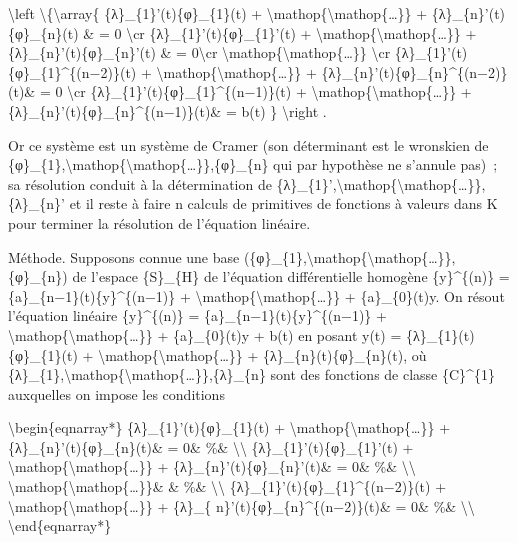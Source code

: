 \documentclass[]{article}
\begin{document}
\textbackslash{}left \textbackslash{}\{\textbackslash{}array\{
\{λ\}\_\{1\}'(t)\{φ\}\_\{1\}(t) +
\textbackslash{}mathop\{\textbackslash{}mathop\{\ldots{}\}\} +
\{λ\}\_\{n\}'(t)\{φ\}\_\{n\}(t) \& = 0 \textbackslash{}cr
\{λ\}\_\{1\}'(t)\{φ\}\_\{1\}'(t) +
\textbackslash{}mathop\{\textbackslash{}mathop\{\ldots{}\}\} +
\{λ\}\_\{n\}'(t)\{φ\}\_\{n\}'(t) \& = 0\textbackslash{}cr
\textbackslash{}mathop\{\textbackslash{}mathop\{\ldots{}\}\}
\textbackslash{}cr \{λ\}\_\{1\}'(t)\{φ\}\_\{1\}\^{}\{(n−2)\}(t) +
\textbackslash{}mathop\{\textbackslash{}mathop\{\ldots{}\}\} +
\{λ\}\_\{n\}'(t)\{φ\}\_\{n\}\^{}\{(n−2)\}(t)\& = 0 \textbackslash{}cr
\{λ\}\_\{1\}'(t)\{φ\}\_\{1\}\^{}\{(n−1)\}(t) +
\textbackslash{}mathop\{\textbackslash{}mathop\{\ldots{}\}\} +
\{λ\}\_\{n\}'(t)\{φ\}\_\{n\}\^{}\{(n−1)\}(t)\& = b(t) \}
\textbackslash{}right .

Or ce système est un système de Cramer (son déterminant est le wronskien
de
\{φ\}\_\{1\},\textbackslash{}mathop\{\textbackslash{}mathop\{\ldots{}\}\},\{φ\}\_\{n\}
qui par hypothèse ne s'annule pas)~; sa résolution conduit à la
détermination de
\{λ\}\_\{1\}',\textbackslash{}mathop\{\textbackslash{}mathop\{\ldots{}\}\},\{λ\}\_\{n\}'
et il reste à faire n calculs de primitives de fonctions à valeurs dans
K pour terminer la résolution de l'équation linéaire.

Méthode. Supposons connue une base
(\{φ\}\_\{1\},\textbackslash{}mathop\{\textbackslash{}mathop\{\ldots{}\}\},\{φ\}\_\{n\})
de l'espace \{S\}\_\{H\} de l'équation différentielle homogène
\{y\}\^{}\{(n)\} = \{a\}\_\{n−1\}(t)\{y\}\^{}\{(n−1)\} +
\textbackslash{}mathop\{\textbackslash{}mathop\{\ldots{}\}\} +
\{a\}\_\{0\}(t)y. On résout l'équation linéaire \{y\}\^{}\{(n)\} =
\{a\}\_\{n−1\}(t)\{y\}\^{}\{(n−1)\} +
\textbackslash{}mathop\{\textbackslash{}mathop\{\ldots{}\}\} +
\{a\}\_\{0\}(t)y + b(t) en posant y(t) = \{λ\}\_\{1\}(t)\{φ\}\_\{1\}(t)
+ \textbackslash{}mathop\{\textbackslash{}mathop\{\ldots{}\}\} +
\{λ\}\_\{n\}(t)\{φ\}\_\{n\}(t), où
\{λ\}\_\{1\},\textbackslash{}mathop\{\textbackslash{}mathop\{\ldots{}\}\},\{λ\}\_\{n\}
sont des fonctions de classe \{C\}\^{}\{1\} auxquelles on impose les
conditions

\textbackslash{}begin\{eqnarray*\} \{λ\}\_\{1\}'(t)\{φ\}\_\{1\}(t) +
\textbackslash{}mathop\{\textbackslash{}mathop\{\ldots{}\}\} +
\{λ\}\_\{n\}'(t)\{φ\}\_\{n\}(t)\& = 0\& \%\&
\textbackslash{}\textbackslash{} \{λ\}\_\{1\}'(t)\{φ\}\_\{1\}'(t) +
\textbackslash{}mathop\{\textbackslash{}mathop\{\ldots{}\}\} +
\{λ\}\_\{n\}'(t)\{φ\}\_\{n\}'(t)\& = 0\& \%\&
\textbackslash{}\textbackslash{}
\textbackslash{}mathop\{\textbackslash{}mathop\{\ldots{}\}\}\& \& \%\&
\textbackslash{}\textbackslash{}
\{λ\}\_\{1\}'(t)\{φ\}\_\{1\}\^{}\{(n−2)\}(t) +
\textbackslash{}mathop\{\textbackslash{}mathop\{\ldots{}\}\} + \{λ\}\_\{
n\}'(t)\{φ\}\_\{n\}\^{}\{(n−2)\}(t)\& = 0\& \%\&
\textbackslash{}\textbackslash{} \textbackslash{}end\{eqnarray*\}
\end{document}
